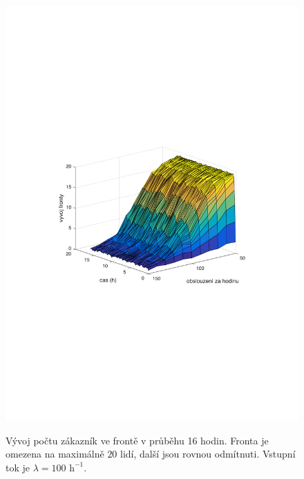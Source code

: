 \documentclass[a4paper,12pt]{article}
\begin{document}
\begin{figure}
\centering
\includegraphics[width=0.8\columnwidth]{frontaMax.pdf}
\label{fig:frontaMax}
\caption{Vývoj počtu zákazník ve frontě v průběhu 16 hodin. Fronta je omezena na maximálně \(20\) lidí, 
další jsou rovnou odmítnuti. Vstupní tok je \(\lambda = 100 \mbox{~h}^{-1}\). }
\end{figure}
\end{document}
